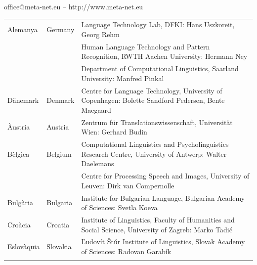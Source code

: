 \begin{multicols}{2}
\begin{itemize}
\vfill
\centerline{office@meta-net.eu -- http://www.meta-net.eu}

\cleardoublepage

\appendix
{}

%

  
\cleardoublepage

\label{metanetmembers}

\small

\begin{longtable}{@{}llp{113mm}@{}}
  Alemanya & \textcolor{grey1}{Germany} & Language Technology Lab, DFKI: Hans Uszkoreit, Georg Rehm\\ \addlinespace
  & & Human Language Technology and Pattern Recognition, RWTH Aachen University: Hermann Ney \\ \addlinespace
  & & Department of Computational Linguistics, Saarland University: Manfred Pinkal\\ \addlinespace Dänemark &  \textcolor{grey1}{Denmark} & Centre for Language Technology, University of Copenhagen: \newline Bolette Sandford Pedersen, Bente Maegaard\\ \addlinespace
  Àustria & \textcolor{grey1}{Austria} & Zentrum für Translationswissenschaft, Universität Wien: Gerhard Budin\\ \addlinespace 
  Bèlgica & \textcolor{grey1}{Belgium} & Computational Linguistics and Psycholinguistics Research Centre, University of Antwerp: Walter Daelemans\\ \addlinespace
  & & Centre for Processing Speech and Images, University of Leuven: Dirk van Compernolle \\ \addlinespace
  Bulgària & \textcolor{grey1}{Bulgaria} & Institute for Bulgarian Language, Bulgarian Academy of Sciences: Svetla Koeva \\ \addlinespace
  Croàcia & \textcolor{grey1}{Croatia} & Institute of Linguistics, Faculty of Humanities and Social Science, University of Zagreb: Marko Tadić \\ \addlinespace
  Eslovàquia & \textcolor{grey1}{Slovakia} & Ľudovít Štúr Institute of Linguistics, Slovak Academy of Sciences: Radovan Garabík \\ \addlinespace 

\end{longtable}
\end{itemize}
\end{multicols}
